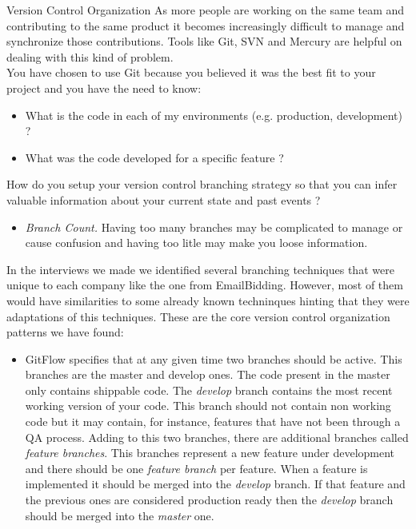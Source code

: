 \begin{pattern}{Version Control Organization} \label{chap:patterns:pattern:vco}
    \context
    As more people are working on the same team and contributing to the same product it becomes increasingly difficult to manage and synchronize those contributions. Tools like Git, SVN and Mercury are helpful on dealing with this kind of problem. \\
    You have chosen to use Git because you believed it was the best fit to your project and you have the need to know:
    \begin{itemize}
        \item What is the code in each of my environments (e.g. production, development) ?
        \item What was the code developed for a specific feature ?
    \end{itemize}

    \problem
    How do you setup your version control branching strategy so that you can infer valuable information about your current state and past events ?

    \forces
        \begin{itemize}
            \item \textit{Branch Count.} Having too many branches may be complicated to manage or cause confusion and having too litle may make you loose information.
        \end{itemize}
    \solution
    In the interviews we made we identified several branching techniques that were unique to each company like the one from EmailBidding. However, most of them would have similarities to some already known techninques hinting that they were adaptations of this techniques. These are the core version control organization patterns we have found:
        \begin{itemize}
            \item GitFlow specifies that at any given time two branches should be active. This branches are the master and develop ones. The code present in the master only contains shippable code. The \textit{develop} branch contains the most recent working version of your code. This branch should not contain non working code but it may contain, for instance, features that have not been through a QA process. Adding to this two branches, there are additional branches called \textit{feature branches}. This branches represent a new feature under development and there should be one \textit{feature branch} per feature. When a feature is implemented it should be merged into the \textit{develop} branch. If that feature and the previous ones are considered production ready then the \textit{develop} branch should be merged into the \textit{master} one.


\end{itemize}
\end{pattern}
